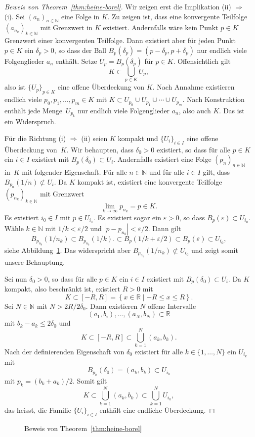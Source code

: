 \documentclass[../main.tex]{subfiles}
\begin{document}
\begin{proof}[Beweis von Theorem~\ref{thm:heine-borel}]
  Wir zeigen erst die Implikation
  (ii) $\Rightarrow$ (i). Sei
  ${(a_{n})}_{n \in \mathbb{N}}$ eine
  Folge in $K$. Zu zeigen ist, dass
  eine konvergente Teilfolge
  ${(a_{n_{k}})}_{k \in \mathbb{N}}$ 
  mit Grenzwert in $K$ existiert.
  Andernfalls wäre kein Punkt $p \in K$ 
  Grenzwert einer konvergenten Teilfolge.
  Dann existiert aber für jeden Punkt $p \in K$ 
  ein $\delta_p > 0$, so
  dass der Ball $B_p(\delta_p) = (p - \delta_p, p + \delta_p)$ 
  nur endlich viele Folgenglieder $a_n$ enthält.
  Setze  $U_p = B_{p}(\delta_p)$ für $p \in K$.
  Offensichtlich gilt
  \[
    K \subset \bigcup_{p \in K} U_p,
  \]
  also ist ${\{U_p\}}_{p \in K}$ eine offene Überdeckung
  von $K$. Nach Annahme existieren
  endlich viele $p_0, p_1, \dots, p_m \in K$ 
  mit $K \subset U_{p_0} \cup U_{p_1}
  \cup \cdots \cup U_{p_m}$.
  Nach Konstruktion enthält jede Menge~$U_{p_k}$ 
  nur endlich viele Folgenglieder
  $a_n$, also auch $K$. Das ist ein Widerspruch.
  
  Für die Richtung (i) $\Rightarrow$ (ii) seien
  $K$ kompakt und ${\{U_i\}}_{i \in I}$ eine
  offene Überdeckung von~$K$.
  Wir behaupten, dass
  $\delta_0 > 0$ existiert, so dass
  für alle $p \in K$ ein $i \in I$ existiert
  mit $B_p(\delta_0) \subset U_i$.
  Andernfalls existiert eine Folge
  ${(p_{n})}_{n \in \mathbb{N}}$ in~$K$ 
  mit folgender Eigenschaft.
  Für alle $n \in \mathbb{N}$ 
  und für alle $i \in I$ 
  gilt, dass
  $B_{p_n}(1/n) \not \subset U_i$.
  Da $K$ kompakt ist,
  existiert eine konvergente Teilfolge
  ${(p_{n_k})}_{k \in \mathbb{N}}$
   mit Grenzwert
  \[
    \lim_{k \to \infty} p_{n_k} = p \in K.
  \]
  Es existiert $i_0 \in I$ 
  mit $p \in U_{i_0}$.
  Es existiert sogar ein
  $\varepsilon > 0$, so dass
  $B_p(\varepsilon) \subset U_{i_0}$.
  Wähle $k \in \mathbb{N}$ mit
  $1/k < \varepsilon/2$
  und $|p - p_{n_k}| < \varepsilon/2$.
  Dann gilt
  \[
    B_{p_{n_k}}(1/n_k) \subset B_{p_{n_k}}(1/k).
    \subset B_p(1/k + \varepsilon / 2)
    \subset B_p(\varepsilon) \subset U_{i_0},
  \]
  siehe Abbildung~\ref{fig:heine-borel}.
  Das widerspricht aber
  $B_{p_{n_k}}(1/n_k) \not\subset U_{i_0}$
  und zeigt somit unsere Behauptung.

  Sei nun $\delta_0 > 0$, so dass
  für alle $p \in K$ 
  ein $i \in I$ existiert
  mit $B_p(\delta_0) \subset U_i$.
  Da $K$ kompakt, also beschränkt ist,
  existiert $R > 0$ mit \[K \subset
  [-R, R] = \left\{x \in \mathbb{R} \mid 
-R \leq x \leq R\right\}.\]
  Sei $N \in \mathbb{N}$ 
  mit $N > 2R/2\delta_0$.
  Dann existieren $N$ offene Intervalle
  \[
    (a_1, b_i), \dots, (a_N, b_N) \subset \mathbb{R}
  \]
  mit $b_k - a_k \leq 2 \delta_0$
  und
  \[
    K \subset [-R, R] \subset \bigcup_{k=1}^{N}(a_k, b_k).
  \]
  Nach der definierenden Eigenschaft von $\delta_0$
  existiert
  für alle $k \in \{1, \dots , N \}$ 
  ein $U_{i_k}$ mit
  \[
    B_{p_k}(\delta_0) = (a_k, b_k) \subset U_{i_k}
  \]
  mit $p_k = (b_k + a_k)/2$.
  Somit gilt
  \[
    K \subset \bigcup_{k=1}^{N} (a_k, b_k) \subset
    \bigcup_{k=1}^{N} U_{i_k},
  \]
  das heisst, die Familie ${\{U_i\}}_{i \in I}$ enthält
  eine endliche Überdeckung.
\end{proof}

\begin{figure}[htb]
  \centering
  
  \caption{Beweis von Theorem~\ref{thm:heine-borel}}%
  \label{fig:heine-borel}
\end{figure}
\end{document}

